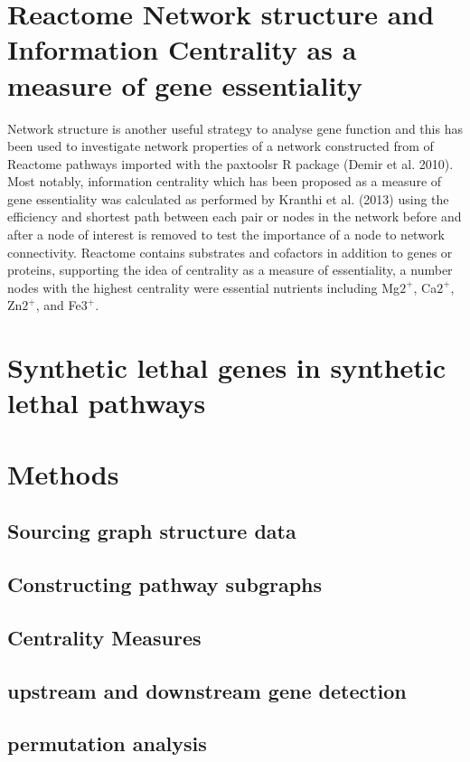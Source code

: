 \section{Reactome Network structure and Information Centrality as a measure of gene essentiality}

Network structure is another useful strategy to analyse gene function and this has been used to investigate network properties of a network constructed from of Reactome pathways imported with the paxtoolsr R package (Demir et al. 2010). Most notably, information centrality which has been proposed as a measure of gene essentiality was calculated as performed by Kranthi et al. (2013) using the efficiency and shortest path between each pair or nodes in the network before and after a node of interest is removed to test the importance of a node to network connectivity. Reactome contains substrates and cofactors in addition to genes or proteins, supporting the idea of centrality as a measure of essentiality, a number nodes with the highest centrality were essential nutrients including Mg$2^+$, Ca$2^+$, Zn$2^+$,  and Fe$3^+$.

\section{Synthetic lethal genes in synthetic lethal pathways}

\section{Methods}
\subsection{Sourcing graph structure data}
\subsection{Constructing pathway subgraphs}
\subsection{Centrality Measures}
\subsection{upstream and downstream gene detection}
\subsection{permutation analysis}


